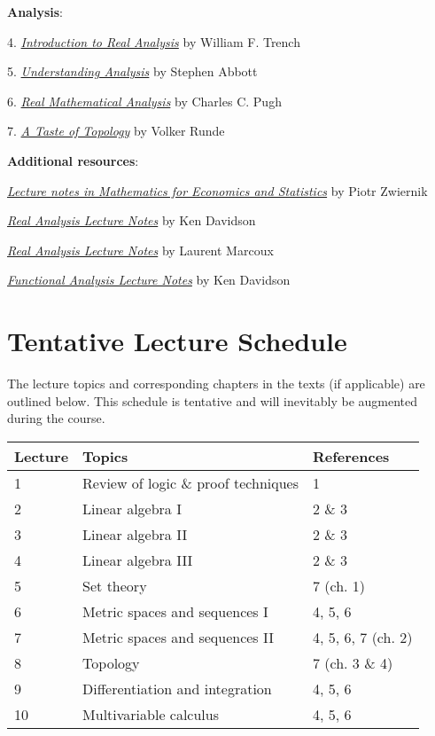 \documentclass[12pt]{article}
\begin{document}
\noindent
{\bf{Analysis}}:
\vspace{0.1cm}

4. \href{https://digitalcommons.trinity.edu/mono/7/}{{\emph{Introduction to Real Analysis}}} by William F. Trench

5. \href{https://link-springer-com.myaccess.library.utoronto.ca/book/10.1007/978-1-4939-2712-8}{{\emph{Understanding Analysis}}} by Stephen Abbott

6. \href{https://link-springer-com.myaccess.library.utoronto.ca/book/10.1007/978-3-319-17771-7}{\emph{Real Mathematical Analysis}} by Charles C. Pugh

7. \href{https://link-springer-com.myaccess.library.utoronto.ca/book/10.1007/0-387-28387-0}{\emph{A Taste of Topology}} by Volker Runde


\vspace{1em}

\noindent
{\bf{Additional resources}}:
\vspace{0.1cm}

\href{http://84.89.132.1/~piotr/docs/RealAnalysisNotes.pdf}{\emph{Lecture notes in Mathematics for Economics and Statistics}} by Piotr Zwiernik

\href{http://www.math.uwaterloo.ca/~krdavids/PM351/PMath351Notes.pdf}{{\emph{Real Analysis Lecture Notes}}} by Ken Davidson

\href{http://www.math.uwaterloo.ca/~lwmarcou/notes/pmath351.pdf}{{\emph{Real Analysis Lecture Notes}}} by Laurent Marcoux

\href{http://www.math.uwaterloo.ca/~krdavids/FA/PM453Notes.pdf}{{\emph{Functional Analysis Lecture Notes}}} by Ken Davidson




\section{Tentative Lecture Schedule}
The lecture topics and corresponding chapters in the texts (if applicable) are outlined below.  This schedule is tentative and will inevitably be augmented during the course.  


\begin{longtable}{| p{1.5cm}  | p{8cm} | p{3cm} |}
\hline
{\bf{Lecture}}  & {\bf{Topics}} &  {\bf{References}} \\
\hline
1  & Review of logic \& proof techniques &  1 \\
\hline
2 &  Linear algebra I & 2 \& 3 \\
\hline
3  &  Linear algebra II & 2 \& 3  \\
\hline
4  & Linear algebra III &  2 \& 3 \\
\hline
5  & Set theory & 7 (ch. 1) \\
\hline
6  &  Metric spaces and sequences I &  4, 5, 6\\
\hline
7  & Metric spaces and sequences II & 4, 5, 6, 7 (ch. 2)  \\
\hline
8  & Topology & 7 (ch. 3 \& 4) \\
 \hline
9  &  Differentiation and integration &  4, 5, 6 \\
\hline
10  &   Multivariable calculus & 4, 5, 6 \\
\hline
\end{longtable}
\end{document}
